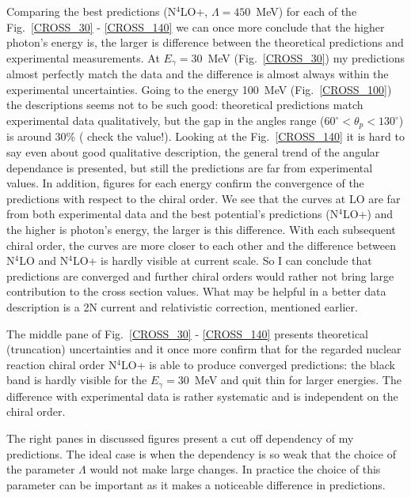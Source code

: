     Comparing the best predictions (N$^4$LO+, $\Lambda=450$~MeV) for each
    of the Fig.~\ref{CROSS_30} - \ref{CROSS_140} we can once more 
    conclude that the higher photon's energy is, the larger is 
    difference between the theoretical predictions and experimental 
    measurements. At $E_\gamma = 30$~MeV (Fig.~\ref{CROSS_30}) my predictions
    almost perfectly match the data and the difference is almost always
    within the experimental uncertainties. Going to the energy 100~MeV (Fig.~\ref{CROSS_100})
    the descriptions seems not to be such good: theoretical
    predictions match experimental data qualitatively, but
    the gap in the angles range ($60^{\circ} < \theta_p < 130^{\circ}$) 
    is around 30\% ({\color{red} check the value!}).
    Looking at the Fig.~\ref{CROSS_140} it is hard to say even about 
    good qualitative description, the general trend of the
    angular dependance is presented, but still the predictions are 
    far from experimental values.
    In addition, figures for each energy confirm the convergence 
    of the predictions with respect to the chiral order.
    We see that the curves at LO are far from both experimental 
    data and the best potential's predictions (N$^4$LO+) and
    the higher is photon's energy, the larger is this
    difference. With each subsequent chiral order, the 
    curves are more closer to each other and the difference
    between N$^4$LO and N$^4$LO+ is hardly visible at current scale.
    So I can conclude that predictions are converged and 
    further chiral orders would rather not bring large contribution 
    to the cross section values. What may be helpful
    in a better data description is a 2N current 
    and relativistic correction, mentioned earlier.

    The middle pane of Fig.~\ref{CROSS_30} - \ref{CROSS_140} 
    presents theoretical (truncation) uncertainties and it once more
    confirm that for the regarded nuclear reaction chiral order
    N$^4$LO+ is able to produce converged predictions: 
    the black band is hardly visible for the $E_\gamma=30$~MeV 
    and quit thin for larger energies. 
    The difference with experimental data is rather systematic 
    and is independent on the chiral order. 

    The right panes in discussed figures present a cut off dependency
    of my predictions. The ideal case is when the dependency is so weak that
    the choice of the parameter $\Lambda$ would not make large 
    changes. In practice the choice of this parameter can be 
    important as it makes a noticeable difference in predictions.
    
